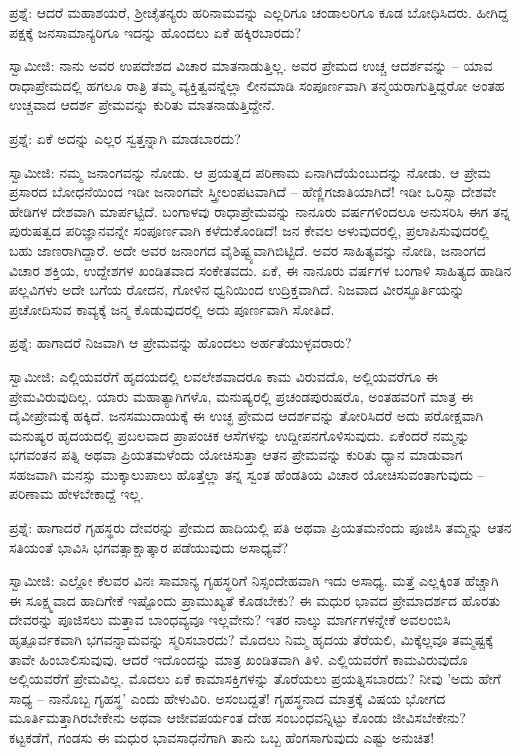 ಪ್ರಶ್ನೆ: ಆದರೆ ಮಹಾಶಯರೆ, ಶ‍್ರೀಚೈತನ್ಯರು ಹರಿನಾಮವನ್ನು ಎಲ್ಲರಿಗೂ ಚಂಡಾಲರಿಗೂ ಕೂಡ ಬೋಧಿಸಿದರು. ಹೀಗಿದ್ದ ಪಕ್ಷಕ್ಕೆ ಜನಸಾಮಾನ್ಯರಿಗೂ ಇದನ್ನು ಹೊಂದಲು ಏಕೆ ಹಕ್ಕಿರಬಾರದು?

ಸ್ವಾಮೀಜಿ: ನಾನು ಅವರ ಉಪದೇಶದ ವಿಚಾರ ಮಾತನಾಡುತ್ತಿಲ್ಲ. ಅವರ ಪ್ರೇಮದ ಉಚ್ಚ ಆದರ್ಶವನ್ನು – ಯಾವ ರಾಧಾಪ್ರೇಮದಲ್ಲಿ ಹಗಲೂ ರಾತ್ರಿ ತಮ್ಮ ವ್ಯಕ್ತಿತ್ವವನ್ನೆಲ್ಲಾ ಲೀನಮಾಡಿ ಸಂಪೂರ್ಣವಾಗಿ ತನ್ಮಯರಾಗುತ್ತಿದ್ದರೋ ಅಂತಹ ಉಚ್ಚವಾದ ಆದರ್ಶ ಪ್ರೇಮವನ್ನು ಕುರಿತು ಮಾತನಾಡುತ್ತಿದ್ದೇನೆ.

ಪ್ರಶ್ನೆ: ಏಕೆ ಅದನ್ನು ಎಲ್ಲರ ಸ್ವತ್ತನ್ನಾಗಿ ಮಾಡಬಾರದು?

ಸ್ವಾಮೀಜಿ: ನಮ್ಮ ಜನಾಂಗವನ್ನು ನೋಡು. ಆ ಪ್ರಯತ್ನದ ಪರಿಣಾಮ ಏನಾಗಿದೆಯೆಂಬುದನ್ನು ನೋಡು. ಆ ಪ್ರೇಮ ಪ್ರಸಾರದ ಬೋಧನೆಯಿಂದ ಇಡೀ ಜನಾಂಗವೇ ಸ್ತ್ರೀಲಂಪಟವಾಗಿದೆ – ಹೆಣ್ಣಿಗಜಾತಿಯಾಗಿದೆ! ಇಡೀ ಒರಿಸ್ಸಾ ದೇಶವೇ ಹೇಡಿಗಳ ದೇಶವಾಗಿ ಮಾರ್ಪಟ್ಟಿದೆ. ಬಂಗಾಳವು ರಾಧಾಪ್ರೇಮವನ್ನು ನಾನೂರು ವರ್ಷಗಳಿಂದಲೂ ಅನುಸರಿಸಿ ಈಗ ತನ್ನ ಪುರುಷತ್ವದ ಪರಿಜ್ಞಾನವನ್ನೇ ಸಂಪೂರ್ಣವಾಗಿ ಕಳೆದುಕೊಂಡಿದೆ! ಜನ ಕೇವಲ ಅಳುವುದರಲ್ಲಿ, ಪ್ರಲಾಪಿಸುವುದರಲ್ಲಿ ಬಹು ಜಾಣರಾಗಿದ್ದಾರೆ. ಅದೇ ಅವರ ಜನಾಂಗದ ವೈಶಿಷ್ಟ್ಯವಾಗಿಬಿಟ್ಟಿದೆ. ಅವರ ಸಾಹಿತ್ಯವನ್ನು ನೋಡಿ, ಜನಾಂಗದ ವಿಚಾರ ಶಕ್ತಿಯ, ಉದ್ದೇಶಗಳ ಖಂಡಿತವಾದ ಸಂಕೇತವದು. ಏಕೆ, ಈ ನಾನೂರು ವರ್ಷಗಳ ಬಂಗಾಳಿ ಸಾಹಿತ್ಯದ ಹಾಡಿನ ಪಲ್ಲವಿಗಳು ಅದೇ ಬಗೆಯ ರೋದನ, ಗೋಳಿನ ಧ್ವನಿಯಿಂದ ಉದ್ರಿಕ್ತವಾಗಿದೆ. ನಿಜವಾದ ವೀರಸ್ಫೂರ್ತಿಯನ್ನು ಪ್ರಚೋದಿಸುವ ಕಾವ್ಯಕ್ಕೆ ಜನ್ಮ ಕೊಡುವುದರಲ್ಲಿ ಅದು ಪೂರ್ಣವಾಗಿ ಸೋತಿದೆ.

ಪ್ರಶ್ನೆ: ಹಾಗಾದರೆ ನಿಜವಾಗಿ ಆ ಪ್ರೇಮವನ್ನು ಹೊಂದಲು ಅರ್ಹತೆಯುಳ್ಳವರಾರು?

ಸ್ವಾಮೀಜಿ: ಎಲ್ಲಿಯವರೆಗೆ ಹೃದಯದಲ್ಲಿ ಲವಲೇಶವಾದರೂ ಕಾಮ ವಿರುವದೊ, ಅಲ್ಲಿಯವರೆಗೂ ಈ ಪ್ರೇಮವಿರುವುದಿಲ್ಲ. ಯಾರು ಮಹಾತ್ಯಾಗಿಗಳೊ, ಮನುಷ್ಯರಲ್ಲಿ ಪ್ರಚಂಡಪುರುಷರೊ, ಅಂತಹವರಿಗೆ ಮಾತ್ರ ಈ ದೈವೀಪ್ರೇಮಕ್ಕೆ ಹಕ್ಕಿದೆ. ಜನಸಮುದಾಯಕ್ಕೆ ಈ ಉಚ್ಛ ಪ್ರೇಮದ ಆದರ್ಶವನ್ನು ತೋರಿಸಿದರೆ ಅದು ಪರೋಕ್ಷವಾಗಿ ಮನುಷ್ಯರ ಹೃದಯದಲ್ಲಿ ಪ್ರಬಲವಾದ ಪ್ರಾಪಂಚಿಕ ಆಸೆಗಳನ್ನು ಉದ್ದೀಪನಗೊಳಿಸುವುದು. ಏಕೆಂದರೆ ನಮ್ಮನ್ನು ಭಗವಂತನ ಪತ್ನಿ ಅಥವಾ ಪ್ರಿಯತಮಳೆಂದು ಯೋಚಿಸುತ್ತಾ ಆತನ ಪ್ರೇಮವನ್ನು ಕುರಿತು ಧ್ಯಾನ ಮಾಡುವಾಗ ಸಹಜವಾಗಿ ಮನಸ್ಸು ಮುಕ್ಕಾಲುಪಾಲು ಹೊತ್ತೆಲ್ಲಾ ತನ್ನ ಸ್ವಂತ ಹೆಂಡತಿಯ ವಿಚಾರ ಯೋಚಿಸುವಂತಾಗುವುದು – ಪರಿಣಾಮ ಹೇಳಬೇಕಾದ್ದೆ ಇಲ್ಲ.

ಪ್ರಶ್ನೆ: ಹಾಗಾದರೆ ಗೃಹಸ್ಥರು ದೇವರನ್ನು ಪ್ರೇಮದ ಹಾದಿಯಲ್ಲಿ ಪತಿ ಅಥವಾ ಪ್ರಿಯತಮನೆಂದು ಪೂಜಿಸಿ ತಮ್ಮನ್ನು ಆತನ ಸತಿಯಂತೆ ಭಾವಿಸಿ ಭಗವತ್ಸಾಕ್ಷಾತ್ಕಾರ ಪಡೆಯುವುದು ಅಸಾಧ್ಯವೆ?

ಸ್ವಾಮೀಜಿ: ಎಲ್ಲೋ ಕೆಲವರ ವಿನಃ ಸಾಮಾನ್ಯ ಗೃಹಸ್ಥರಿಗೆ ನಿಸ್ಸಂದೇಹವಾಗಿ ಇದು ಅಸಾಧ್ಯ. ಮತ್ತೆ ಎಲ್ಲಕ್ಕಿಂತ ಹೆಚ್ಚಾಗಿ ಈ ಸೂಕ್ಷ್ಮವಾದ ಹಾದಿಗೇಕೆ ಇಷ್ಟೊಂದು ಪ್ರಾಮುಖ್ಯತೆ ಕೊಡಬೇಕು? ಈ ಮಧುರ ಭಾವದ ಪ್ರೇಮಾದರ್ಶದ ಹೊರತು ದೇವರನ್ನು ಪೂಜಿಸಲು ಮತ್ತಾವ ಬಾಂಧವ್ಯವೂ ಇಲ್ಲವೇನು? ಇತರ ನಾಲ್ಕು ಮಾರ್ಗಗಳನ್ನೇಕೆ ಅವಲಂಬಿಸಿ ಹೃತ್ಪೂರ್ವಕವಾಗಿ ಭಗವನ್ನಾಮವನ್ನು ಸ್ಮರಿಸಬಾರದು? ಮೊದಲು ನಿಮ್ಮ ಹೃದಯ ತೆರೆಯಲಿ, ಮಿಕ್ಕೆಲ್ಲವೂ ತಮ್ಮಷ್ಟಕ್ಕೆ ತಾವೇ ಹಿಂಬಾಲಿಸುವುವು. ಆದರೆ ಇದೊಂದನ್ನು ಮಾತ್ರ ಖಂಡಿತವಾಗಿ ತಿಳಿ. ಎಲ್ಲಿಯವರೆಗೆ ಕಾಮವಿರುವುದೊ ಅಲ್ಲಿಯವರೆಗೆ ಪ್ರೇಮವಿಲ್ಲ. ಮೊದಲು ಏಕೆ ಕಾಮಾಸಕ್ತಿಗಳನ್ನು ತೊರೆಯಲು ಪ್ರಯತ್ನಿಸಬಾರದು? ನೀವು 'ಅದು ಹೇಗೆ ಸಾಧ್ಯ – ನಾನೊಬ್ಬ ಗೃಹಸ್ಥ' ಎಂದು ಹೇಳುವಿರಿ. ಅಸಂಬದ್ದತೆ! ಗೃಹಸ್ಥನಾದ ಮಾತ್ರಕ್ಕೆ ವಿಷಯ ಭೋಗದ ಮೂರ್ತಿಮತ್ತಾಗಿರಬೇಕೇನು ಅಥವಾ ಆಜೀವಪರ್ಯಂತ ದೇಹ ಸಂಬಂಧವನ್ನಿಟ್ಟು ಕೊಂಡು ಜೀವಿಸಬೇಕೇನು? ಕಟ್ಟಕಡೆಗೆ, ಗಂಡಸು ಈ ಮಧುರ ಭಾವಸಾಧನೆಗಾಗಿ ತಾನು ಒಬ್ಬ ಹೆಂಗಸಾಗುವುದು ಎಷ್ಟು ಅನುಚಿತ!

